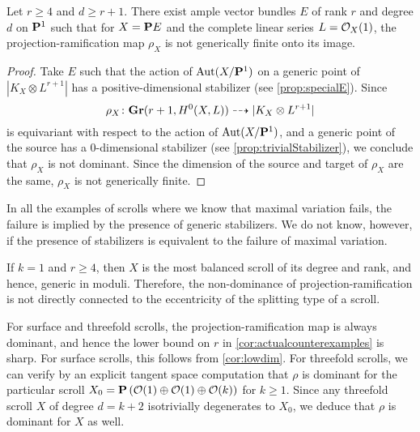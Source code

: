 \begin{corollary}
  \label{cor:actualcounterexamples}
  Let $r \geq 4$ and $d \geq r+1$.
  There exist ample vector bundles $E$ of rank $r$ and degree $d$ on $\P^1$ such that for $X = \P E$ and the complete linear series $L = \O_X(1)$, the projection-ramification map $\rho_X$ is not generically finite onto its image.
\end{corollary}
\begin{proof}
  Take $E$ such that the action of $\Aut(X/\P^1)$ on a generic point of $|K_X\otimes L^{r+1}|$ has a positive-dimensional stabilizer (see \autoref{prop:specialE}).
  Since \[\rho_X \from \Gr(r+1, H^0(X, L)) \dashrightarrow |K_X \otimes L^{r+1}|\] is equivariant with respect to the action of $\Aut(X/\P^1)$, and a generic
  point of the source has a 0-dimensional stabilizer (see \autoref{prop:trivialStabilizer}), we conclude that $\rho_X$ is not dominant.
  Since the dimension of the source and target of $\rho_X$ are the same, $\rho_X$ is not generically finite.
\end{proof}

\begin{remark}
In all the examples of scrolls where we know that maximal variation fails, the failure is implied by the presence of generic stabilizers.
We do not know, however, if the presence of stabilizers is equivalent to the failure of maximal variation.
\end{remark}

\begin{remark}
  If $k = 1$ and $r \geq 4$, then $X$ is the most balanced scroll of its degree and rank, and hence, generic in moduli.
  Therefore, the non-dominance of projection-ramification is not directly connected to the eccentricity of the splitting type of a scroll. 
\end{remark}

\begin{remark}
  For surface and threefold scrolls, the projection-ramification map is always dominant, and hence the lower bound on $r$ in \autoref{cor:actualcounterexamples} is sharp.
  For surface scrolls, this follows from \autoref{cor:lowdim}.
  For threefold scrolls, we can verify by an explicit tangent space computation that $\rho$ is dominant for the particular scroll $X_0 = \P \left(\O(1) \oplus \O(1)\oplus \O(k)\right)$ for $k \geq 1$.
  Since any threefold scroll $X$ of degree $d = k+2$ isotrivially degenerates to $X_0$, we deduce that $\rho$ is dominant for $X$ as well.
\end{remark}

